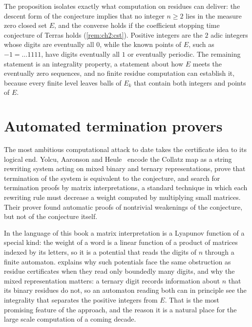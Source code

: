 The proposition isolates exactly what computation on residues can deliver: the descent form of the conjecture implies that no integer $n\ge2$ lies in the measure zero closed set $E$, and the converse holds if the coefficient stopping time conjecture of Terras holds (\cref{rem:ch2:cst}).
Positive integers are the
$2$ adic integers whose digits are eventually all $0$, while the known points of
$E$, such as $-1=\ldots1111$, have digits eventually all $1$ or eventually
periodic. The remaining statement is an integrality property, a statement about
how $E$ meets the eventually zero sequences, and no finite residue computation
can establish it, because every finite level leaves balls of $E_k$ that contain
both integers and points of $E$.

\section{Automated termination provers}\label{sec:ch10b:automated}

The most ambitious computational attack to date takes the certificate idea to its
logical end. Yolcu, Aaronson and Heule~\cite{yolcu2023} encode the Collatz map as a
string rewriting system acting on mixed binary and ternary representations,
prove that termination of the system is equivalent to the conjecture, and search
for termination proofs by matrix interpretations, a standard technique in which
each rewriting rule must decrease a weight computed by multiplying small
matrices. Their prover found automatic proofs of nontrivial weakenings of the
conjecture, but not of the conjecture itself.

In the language of this book a matrix interpretation is a Lyapunov function of
a special kind: the weight of a word is a linear function of a product of
matrices indexed by its letters, so it is a potential that reads the digits of
$n$ through a finite automaton.  explains why such
potentials face the same obstruction as residue certificates when they read
only boundedly many digits, and why the mixed representation matters: a
ternary digit records information about $n$ that its binary residues do not, so
an automaton reading both can in principle see the integrality that separates
the positive integers from $E$. That is the most promising feature of the
approach, and the reason it is a natural place for the large scale computation
of a coming decade.

